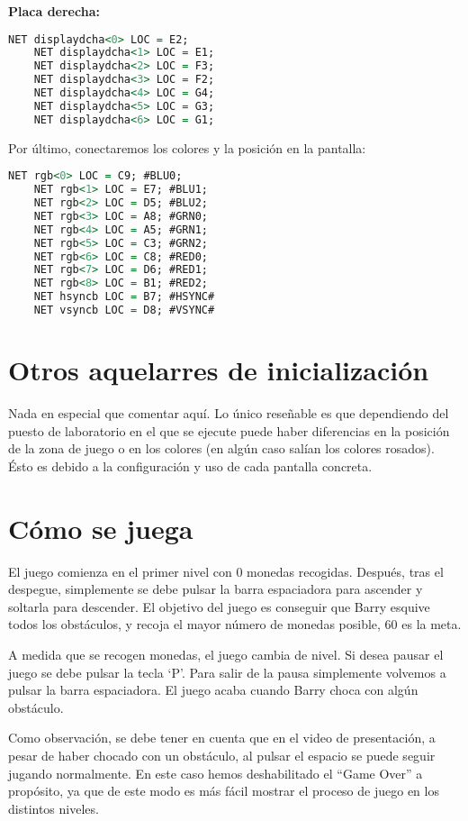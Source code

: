 \documentclass[11pt, a4paper, spanish, openright, twoside]{book}
\begin{document}
\textbf{Placa derecha:}
	
\begin{lstlisting}[language=VHDL]
	NET displaydcha<0> LOC = E2;
	NET displaydcha<1> LOC = E1;
	NET displaydcha<2> LOC = F3;
	NET displaydcha<3> LOC = F2;
	NET displaydcha<4> LOC = G4;
	NET displaydcha<5> LOC = G3;
	NET displaydcha<6> LOC = G1;
\end{lstlisting}


Por último, conectaremos los colores y la posición en la pantalla:

\begin{lstlisting}[language=VHDL]
	NET rgb<0> LOC = C9; #BLU0;
	NET rgb<1> LOC = E7; #BLU1;
	NET rgb<2> LOC = D5; #BLU2;
	NET rgb<3> LOC = A8; #GRN0; 
	NET rgb<4> LOC = A5; #GRN1;
	NET rgb<5> LOC = C3; #GRN2;
	NET rgb<6> LOC = C8; #RED0;
	NET rgb<7> LOC = D6; #RED1;
	NET rgb<8> LOC = B1; #RED2;
	NET hsyncb LOC = B7; #HSYNC# 
	NET vsyncb LOC = D8; #VSYNC# 
\end{lstlisting}

\section{Otros aquelarres de inicialización}

Nada en especial que comentar aquí. Lo único reseñable es que dependiendo del puesto de laboratorio en el que se ejecute puede haber diferencias en la posición de la zona de juego o en los colores (en algún caso salían los colores rosados). Ésto es debido a la configuración y uso de cada pantalla concreta.


\section{Cómo se juega}
El juego comienza en el primer nivel con 0 monedas recogidas. Después, tras el despegue, simplemente se debe pulsar la barra espaciadora para ascender y soltarla para descender. El objetivo del juego es conseguir que Barry esquive todos los obstáculos, y recoja el mayor número de monedas posible, 60 es la meta. 

A medida que se recogen monedas, el juego cambia de nivel. Si desea pausar el juego se debe pulsar la tecla `P'. Para salir de la pausa simplemente volvemos a pulsar la barra espaciadora. El juego acaba cuando Barry choca con algún obstáculo.

Como observación, se debe tener en cuenta que en el video de presentación, a pesar de haber chocado con un obstáculo, al pulsar el espacio se puede seguir jugando normalmente. En este caso hemos deshabilitado el ``Game Over'' a propósito, ya que de este modo es más fácil mostrar el proceso de juego en los distintos niveles.
\end{document}
